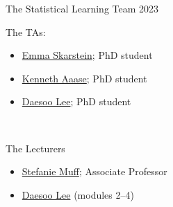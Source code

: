 \documentclass[
  10pt,
  ignorenonframetext,
]{beamer}
\providecommand{\tightlist}{%
  \setlength{\itemsep}{0pt}\setlength{\parskip}{0pt}}
\begin{document}
\begin{frame}{The Statistical Learning Team 2023}
\protect\hypertarget{the-statistical-learning-team-2023}{}
\begin{block}{The TAs:}
\protect\hypertarget{the-tas}{}
\vspace{2mm}

\begin{itemize}
\tightlist
\item
  \href{https://www.ntnu.no/ansatte/emma.s.skarstein}{Emma Skarstein};
  PhD student
\item
  \href{https://www.ntnu.no/ansatte/kenneth.aase}{Kenneth Aaase}; PhD
  student
\item
  \href{https://www.ntnu.no/ansatte/daesoo.lee}{Daesoo Lee}; PhD student
\end{itemize}

\(~\)
\end{block}

\begin{block}{The Lecturers}
\protect\hypertarget{the-lecturers}{}
\vspace{2mm}

\begin{itemize}
\tightlist
\item
  \href{https://www.ntnu.edu/employees/stefanie.muff}{Stefanie Muff};
  Associate Professor
\item
  \href{https://www.ntnu.no/ansatte/daesoo.lee}{Daesoo Lee} (modules
  2--4)
\end{itemize}
\end{block}
\end{frame}
\end{document}
